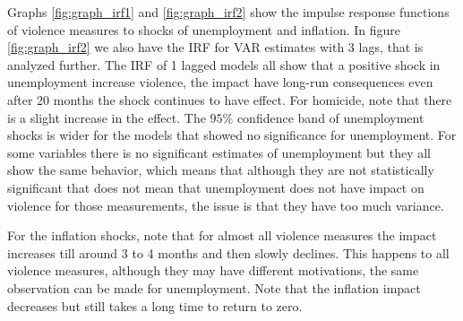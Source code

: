 \documentclass[11pt, a4paper]{article}
\begin{document}
Graphs \ref{fig:graph_irf1} and \ref{fig:graph_irf2} show the impulse response functions of violence measures to shocks of unemployment and inflation. In figure \ref{fig:graph_irf2} we also have the IRF for VAR estimates with 3 lags, that is analyzed further. 
The IRF of  1 lagged models all show that a positive shock in unemployment increase violence, the impact have long-run consequences even after 20 months the shock continues to have effect. For homicide, note that there is a slight increase in the effect.
The $95\%$ confidence band of unemployment shocks is wider for the models that showed no significance for unemployment. For some variables there is no significant estimates of unemployment but they all show the same behavior, which means that although they are not statistically significant that does not mean that unemployment does not have impact on violence for those measurements, the issue is that they have too much variance.

For the inflation shocks, note that for almost all violence measures the impact increases till around 3 to 4 months and then slowly declines. This happens to all violence measures, although they may have different motivations, the same observation can be made for unemployment. Note that the inflation impact decreases but still takes a long time to return to zero. 
\end{document}
